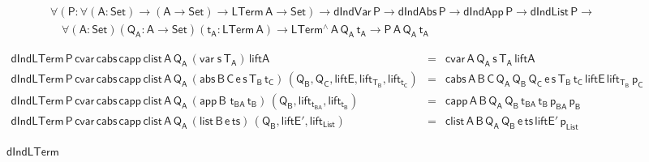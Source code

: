 \documentclass[9pt]{entcs}
\begin{document}
\vspace*{-0.225in}

\begin{equation}\label{eq:ind-lam}
\begin{array}{l}
\mathsf{\forall (P : \forall (A : Set) \to (A \to Set) \to LTerm\,A
  \to Set) \to dIndVar\,P \to dIndAbs\,P \to dIndApp\,P \to
  dIndList\,P \to} \\ \quad \mathsf{\forall (A : Set)(Q_A : A \to
  Set)(t_A : LTerm\,A) \to LTerm^{\wedge}\,A\,Q_A\,t_A \to
  P\,A\,Q_A\,t_A}
\end{array}
\end{equation}

\begin{figure*}[t]

  \begin{adjustbox}{varwidth=6.8in, max width=6.6in, margin=-0.1in 0in
      -0.2in 0in, fbox, center} 
{\small
\[\begin{array}{lll}
\mathsf{dIndLTerm \, P\, cvar \, cabs\, capp\, clist \, A\, Q_A\,
  (var\;s\,T_A) \, liftA} & = & \mathsf{cvar \, A\, Q_A\, s\, T_A\,
  liftA}\\ 
\mathsf{dIndLTerm \, P\, cvar \, cabs\, capp\, clist \, A\, Q_A\,
  (abs \,B \,C \,e \,s \,T_B \, t_C) \, (Q_B , Q_C , liftE,
  lift_{T_B}, lift_{t_C})} & = & \mathsf{cabs\,A\,B\,C\, Q_A\,
  Q_B\, Q_C\, e\, s\, T_B\, t_C\, liftE\, lift_{T_B}\, p_C}\\
\mathsf{dIndLTerm \, P\, cvar \, cabs\, capp\, clist \, A\, Q_A\,
    (app \,B \,\,t_{BA} \, t_B)\, (Q_B , lift_{t_{BA}}, lift_{t_B})} &
= & \mathsf{capp\,A\,B\,Q_A\, Q_B\, t_{BA}\, t_B\, p_{BA} \, p_B}\\
  \mathsf{dIndLTerm \, P\, cvar \, cabs\, capp\, clist \, A\, Q_A\,
    (list \,B \,e \, ts) \, (Q_B , liftE', lift_{List})} & = & 
  \mathsf{clist \,A\,B\,Q_A\, Q_B\, e\, ts\, liftE'\, p_{List} }
\end{array}\]}

\vspace*{-0.1in}

\caption{$\mathsf{dIndLTerm}$}\label{fig:dindlterm} \vspace*{0.1in} 
\end{adjustbox}
\end{figure*}

\vspace*{-0.125in}
\end{document}
